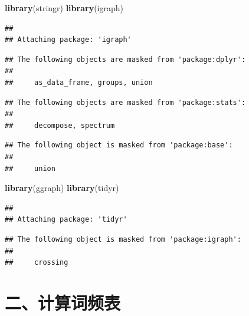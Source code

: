 \documentclass[]{article}
\newenvironment{Shaded}{\begin{snugshade}}{\end{snugshade}}
\newcommand{\KeywordTok}[1]{\textcolor[rgb]{0.13,0.29,0.53}{\textbf{#1}}}
\newcommand{\NormalTok}[1]{#1}
\begin{document}
\begin{Shaded}
\begin{Highlighting}[]
\KeywordTok{library}\NormalTok{(stringr)}
\KeywordTok{library}\NormalTok{(igraph)}
\end{Highlighting}
\end{Shaded}

\begin{verbatim}
## 
## Attaching package: 'igraph'
\end{verbatim}

\begin{verbatim}
## The following objects are masked from 'package:dplyr':
## 
##     as_data_frame, groups, union
\end{verbatim}

\begin{verbatim}
## The following objects are masked from 'package:stats':
## 
##     decompose, spectrum
\end{verbatim}

\begin{verbatim}
## The following object is masked from 'package:base':
## 
##     union
\end{verbatim}

\begin{Shaded}
\begin{Highlighting}[]
\KeywordTok{library}\NormalTok{(ggraph)}
\KeywordTok{library}\NormalTok{(tidyr)}
\end{Highlighting}
\end{Shaded}

\begin{verbatim}
## 
## Attaching package: 'tidyr'
\end{verbatim}

\begin{verbatim}
## The following object is masked from 'package:igraph':
## 
##     crossing
\end{verbatim}

\section{二、计算词频表}\label{ux4e8cux8ba1ux7b97ux8bcdux9891ux8868}
\end{document}
